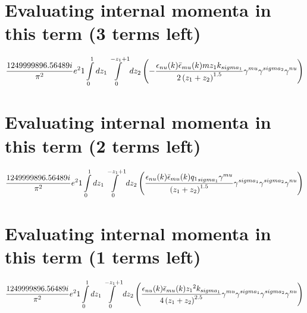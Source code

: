 \section*{Evaluating internal momenta in this term (3 terms left)}
\begin{dmath}\frac{1249999896.56489 i}{\pi^{2}} e^{2}1\int\limits_{ 0 }^{ 1 } d{ z_{ 1 } }\int\limits_{ 0 }^{ - { z_{ 1 } } + 1 } d{ z_{ 2 } }\left(- \frac{\epsilon_{ \\nu }({ k }) \bar{\epsilon}_{ \\mu }({ k }) m { z_{ 1 } } { { k }_{ \\sigma_1 } }}{2 \left({ z_{ 1 } } + { z_{ 2 } }\right)^{1.5}} { \gamma^{ \\mu } } { \gamma^{ \\sigma_2 } } { \gamma^{ \\nu } }\right)\end{dmath}
\section*{Evaluating internal momenta in this term (2 terms left)}
\begin{dmath}\frac{1249999896.56489 i}{\pi^{2}} e^{2}1\int\limits_{ 0 }^{ 1 } d{ z_{ 1 } }\int\limits_{ 0 }^{ - { z_{ 1 } } + 1 } d{ z_{ 2 } }\left(\frac{\epsilon_{ \\nu }({ k }) \bar{\epsilon}_{ \\mu }({ k }) { { q_1 }_{ \\sigma_1 } } { \gamma^{ \\mu } }}{\left({ z_{ 1 } } + { z_{ 2 } }\right)^{1.5}} { \gamma^{ \\sigma_1 } } { \gamma^{ \\sigma_2 } } { \gamma^{ \\nu } }\right)\end{dmath}
\section*{Evaluating internal momenta in this term (1 terms left)}
\begin{dmath}\frac{1249999896.56489 i}{\pi^{2}} e^{2}1\int\limits_{ 0 }^{ 1 } d{ z_{ 1 } }\int\limits_{ 0 }^{ - { z_{ 1 } } + 1 } d{ z_{ 2 } }\left(\frac{\epsilon_{ \\nu }({ k }) \bar{\epsilon}_{ \\mu }({ k }) { z_{ 1 } }^{2} { { k }_{ \\sigma_1 } }}{4 \left({ z_{ 1 } } + { z_{ 2 } }\right)^{2.5}} { \gamma^{ \\mu } } { \gamma^{ \\sigma_1 } } { \gamma^{ \\sigma_2 } } { \gamma^{ \\nu } }\right)\end{dmath}
